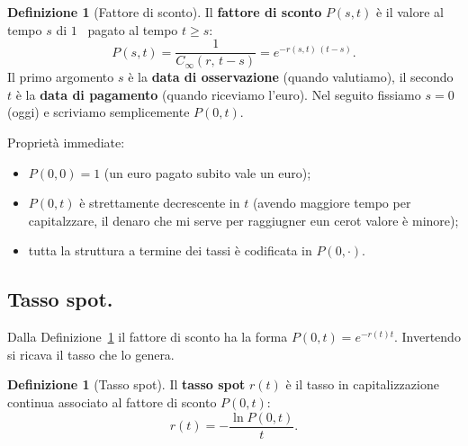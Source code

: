 \documentclass[11pt,a4paper]{article}
\theoremstyle{plain}
\theoremstyle{definition}
\newtheorem{definizione}[teorema]{Definizione}
\theoremstyle{remark}
\begin{document}
\begin{definizione}[Fattore di sconto]
\label{def:sconto}
Il \textbf{fattore di sconto} $P(s,t)$ \`e il valore al tempo $s$ di $1$~\texteuro{}
pagato al tempo $t \ge s$:
\[
  P(s,t) = \frac{1}{C_\infty(r,\,t-s)} = e^{-r(s,t)\,(t-s)}.
\]
Il primo argomento $s$ \`e la \textbf{data di osservazione} (quando valutiamo), il secondo
$t$ \`e la \textbf{data di pagamento} (quando riceviamo l'euro). Nel seguito fissiamo
$s = 0$ (oggi) e scriviamo semplicemente $P(0,t)$.

Propriet\`a immediate:
\begin{itemize}
  \item $P(0,0) = 1$ (un euro pagato subito vale un euro);
  \item $P(0,t)$ \`e strettamente decrescente in $t$ (avendo maggiore tempo per capitalzzare, il denaro che mi serve per raggiugner eun cerot valore è minore);
  \item tutta la struttura a termine dei tassi \`e codificata in $P(0,\cdot)$.
\end{itemize}
\end{definizione}

\subsection{Tasso spot.}

Dalla Definizione~\ref{def:sconto} il fattore di sconto ha la forma $P(0,t)=e^{-r(t)t}$.
Invertendo si ricava il tasso che lo genera.

\begin{definizione}[Tasso spot]
\label{def:spot}
Il \textbf{tasso spot} $r(t)$ \`e il tasso in capitalizzazione continua associato al
fattore di sconto $P(0,t)$:
\begin{equation}
  r(t) = -\frac{\ln P(0,t)}{t}.
  \label{eq:spot-inv}
\end{equation}
\end{definizione}

\end{document}
